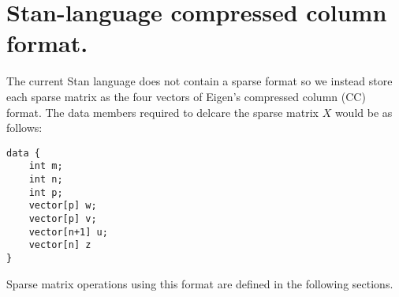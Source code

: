 \section{Stan-language compressed column format.}

The current Stan language does not contain a sparse format so we instead
store each sparse matrix as the four vectors of Eigen's compressed
column (CC) format.  The data members required to delcare the sparse
matrix $X$ would be as follows:

\wrappingon
\begin{verbatim}
data {
	int m;
	int n;
	int p;
	vector[p] w;
	vector[p] v;
	vector[n+1] u;
	vector[n] z
}
\end{verbatim}
\wrappingoff

Sparse matrix operations using this format are defined in the following
sections.





